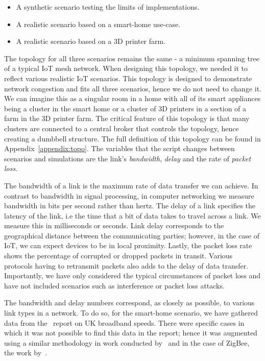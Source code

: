 \begin{itemize}
    \item A synthetic scenario testing the limits of implementations.
    \item A realistic scenario based on a smart-home use-case.
    \item A realistic scenario based on a 3D printer farm.
\end{itemize}

The topology for all three scenarios remains the same - a minimum spanning tree of a typical IoT mesh network.
When designing this topology, we needed it to reflect various realistic IoT scenarios.
This topology is designed to demonstrate network congestion and fits all three scenarios, hence we do not need to change it.
We can imagine this as a singular room in a home with all of its smart appliances being a cluster in the smart home or a cluster of 3D printers in a section of a farm in the 3D printer farm.
The critical feature of this topology is that many clusters are connected to a central broker that controls the topology, hence creating a dumbbell structure.
The full definition of this topology can be found in Appendix~\ref{appendix:topo}.
The variables that the script changes between scenarios and simulations are the link's \textit{bandwidth}, \textit{delay} and the rate of \textit{packet loss}.

The bandwidth of a link is the maximum rate of data transfer we can achieve.
In contrast to bandwidth in signal processing, in computer networking we measure bandwidth in bits per second rather than hertz.
The delay of a link specifies the latency of the link, i.e the time that a bit of data takes to travel across a link. 
We measure this in milliseconds or seconds.
Link delay corresponds to the geographical distance between the communicating parties; however, in the case of IoT, we can expect devices to be in local proximity.
Lastly, the packet loss rate shows the percentage of corrupted or dropped packets in transit.
Various protocols having to retransmit packets also adds to the delay of data transfer.
Importantly, we have only considered the typical circumstances of packet loss and have not included scenarios such as interference or packet loss attacks.

The bandwidth and delay numbers correspond, as closely as possible, to various link types in a network.
To do so, for the smart-home scenario, we have gathered data from the~\cite{ofcom_uk_2021} report on UK broadband speeds.
There were specific cases in which it was not possible to find this data in the report; hence it was augmented using a similar methodology in work conducted by~\cite{previdi_is-is_2019} and in the case of ZigBee, the work by~\citet{alena_fault_2011}.

